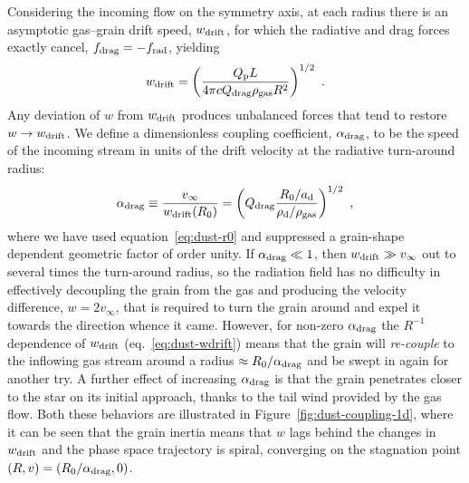 Considering the incoming flow on the symmetry axis, at each radius
there is an asymptotic gas--grain drift speed, \(w_{\text{drift}}\), for which
the radiative and drag forces exactly cancel, \(f_{\text{drag}} = -f_{\text{rad}}\),
yielding
\begin{equation}
  \label{eq:dust-wdrift}
  w_{\text{drift}} = \left( \frac{Q_{\text{p}} L} {4\pi c Q_{\text{drag}} \rho_{\text{gas}} R^2} \right)^{1/2} \ .
\end{equation}
Any deviation of \(w\) from \(w_{\text{drift}}\) produces unbalanced forces
that tend to restore \(w \to w_{\text{drift}}\).  We define a dimensionless
coupling coefficient, \(\alpha_{\text{drag}}\), to be the speed of the incoming
stream in units of the drift velocity at the radiative turn-around
radius:
\begin{equation}
  \label{eq:dust-alpha}
  \alpha_{\text{drag}} \equiv \frac{v_\infty} {w_{\text{drift}}(R_0)} = \left(
    Q_{\text{drag}} \frac{R_0 / a_{\text{d}}} {\rho_{\text{d}} / \rho_{\text{gas}}}
  \right)^{1/2} \ ,
\end{equation}
where we have used equation~\eqref{eq:dust-r0} and suppressed a
grain-shape dependent geometric factor of order unity.  If
\(\alpha_{\text{drag}} \ll 1\), then \(w_{\text{drift}} \gg v_\infty\) out to several times the
turn-around radius, so the radiation field has no difficulty in
effectively decoupling the grain from the gas and producing the
velocity difference, \(w = 2 v_\infty\), that is required to turn the grain
around and expel it towards the direction whence it came.  However,
for non-zero \(\alpha_{\text{drag}}\) the \(R^{-1}\) dependence of \(w_{\text{drift}}\)
(eq.~\eqref{eq:dust-wdrift}) means that the grain will
\textit{re-couple} to the inflowing gas stream around a radius
\(\approx R_0 / \alpha_{\text{drag}} \) and be swept in again for another try.  A further
effect of increasing \(\alpha_{\text{drag}}\) is that the grain penetrates closer to
the star on its initial approach, thanks to the tail wind provided by
the gas flow.  Both these behaviors are illustrated in
Figure~\ref{fig:dust-coupling-1d}, where it can be seen that the grain
inertia means that \(w\) lags behind the changes in \(w_{\text{drift}}\) and
the phase space trajectory is spiral, converging on the stagnation
point \((R, v) = (R_0 / \alpha_{\text{drag}}, 0)\).

